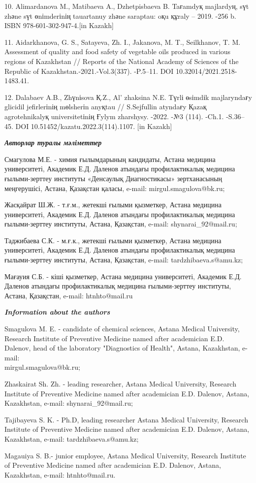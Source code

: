 \begin{references}
10. Alimardanova M., Matibaeva A., Dzhetpisbaeva B. Taғamdyқ majlardyң,
sүt zhәne sүt өnіmderіnің tauartanuy zhәne saraptau: oқu құraly -- 2019.
-256 b. ISBN 978-601-302-947-4.{[}in Kazakh{]}

11. Aidarkhanova, G. S., Satayeva, Zh. I., Jakanova, M. T., Seilkhanov,
T. M. Assessment of quality and food safety of vegetable oils produced
in various regions of Kazakhstan // Reports of the National Academy of
Sciences of the Republic of Kazakhstan.-2021.-Vol.3(337). -P.5--11. DOI
10.32014/2021.2518-1483.41.

12. Dalabaev A.B., Zhүnіsova Қ.Z., Al' zhaksina N.E. Tүrlі
өsіmdіk majlaryndaғy glicidil jefirlerіnің mөlsherіn anyқtau //
S.Sejfullin atyndaғy Қazaқ agrotehnikalyқ universitetіnің Ғylym
zharshysy. -2022. -№3 (114). -Ch.1. -S.36--45. DOI
10.51452/kazatu.2022.3(114).1107. {[}in Kazakh{]}
\end{references}

\begin{authorinfo}
\emph{{\bfseries Авторлар туралы мәліметтер}}

Смагулова М.Е. - химия ғылымдарының кандидаты, Астана медицина
университеті, Академик Е.Д. Даленов атындағы профилактикалық медицина
ғылыми-зерттеу институты «Денсаулық Диагностикасы» зертханасының
меңгерушісі, Астана, Қазақстан қаласы, e-mail: mirgul.smagulova@bk.ru;

Жасқайрат Ш.Ж. - т.ғ.м., жетекші ғылыми қызметкер, Астана медицина
университеті, Академик Е.Д. Даленов атындағы профилактикалық медицина
ғылыми-зерттеу институты, Астана, Қазақстан, e-mail: shynarai\_92@mail.ru;

Таджибаева С.К. - м.ғ.к., жетекші ғылыми қызметкер, Астана медицина
университеті, Академик Е.Д. Даленов атындағы профилактикалық медицина
ғылыми-зерттеу институты, Астана, Қазақстан, e-mail: tardzhibaeva.s@amu.kz;

Мағауия С.Б. - кіші қызметкер, Астана медицина университеті, Академик
Е.Д. Даленов атындағы профилактикалық медицина ғылыми-зерттеу институты,
Астана, Қазақстан, e-mail: htnhto@mail.ru

\emph{{\bfseries Information about the authors}}

Smagulova M. E. - candidate of chemical sciences, Astana Medical
University, Research Institute of Preventive Medicine named after
academician E.D. Dalenov, head of the laboratory "Diagnostics of
Health", Astana, Kazakhstan, e-mail:\\ mirgul.smagulova@bk.ru;

Zhaskairat Sh. Zh. - leading researcher, Astana Medical University,
Research Institute of Preventive Medicine named after academician E.D.
Dalenov, Astana, Kazakhstan, e-mail: shynarai\_92@mail.ru;

Tajibayeva S. K. - Ph.D, leading researcher Astana Medical University,
Research Institute of Preventive Medicine named after academician E.D.
Dalenov, Astana, Kazakhstan, e-mail: tardzhibaeva.s@amu.kz;

Magauiya S. B.- junior employee, Astana Medical University, Research
Institute of Preventive Medicine named after academician E.D. Dalenov,
Astana, Kazakhstan, e-mail: htnhto@mail.ru.
\end{authorinfo}
